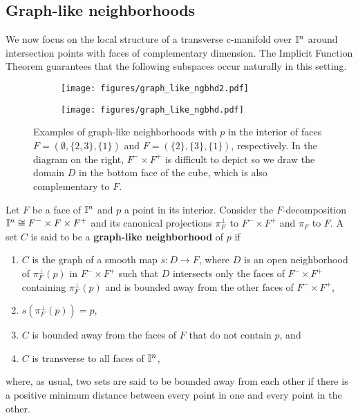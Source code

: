 \subsection{Graph-like neighborhoods}

We now focus on the local structure of a transverse c-manifold over $\mathbb{I}^n$ around intersection points with faces of complementary dimension.
The Implicit Function Theorem guarantees that the following subspaces occur naturally in this setting.

\begin{figure}[!h]
	\centering
	\begin{subfigure}{.32\textwidth}
		\texttt{[image: figures/graph\_like\_ngbhd2.pdf]}
		\hfill
	\end{subfigure}
	\begin{subfigure}{.32\textwidth}
		\hfill
		\texttt{[image: figures/graph\_like\_ngbhd.pdf]}
	\end{subfigure}
	\caption{Examples of graph-like neighborhoods with $p$ in the interior of faces $F=(\emptyset, \{2,3\}, \{1\})$ and $F=(\{2\}, \{3\}, \{1\})$, respectively.
		In the diagram on the right, $F^-\times F^+$ is difficult to depict so we draw the domain $D$ in the bottom face of the cube, which is also complementary to $F$.}
	\label{F:graph like neighborhood}
\end{figure}

\begin{definition}\label{D:graph-like}
	Let $F$ be a face of $\mathbb{I}^n$ and $p$ a point in its interior.
	Consider the $F$-decomposition $\mathbb{I}^n \cong F^- \times F \times F^+$ and its canonical projections $\pi_F^{\perp}$ to $F^- \times F^+$ and $\pi_F$ to $F$.
	A set $C$ is said to be a \textbf{graph-like neighborhood} of $p$ if
	\begin{enumerate}
		\item $C$ is the graph of a smooth map $s \colon D \to F$, where $D$ is an open neighborhood of $\pi_F^\perp(p)$ in $F^- \times F^+$ such that $D$ intersects only the faces of $F^- \times F^+$ containing $\pi_F^\perp(p)$ and is bounded away from the other faces of $F^- \times F^+$,
		\item $s(\pi_F^\perp(p)) = p$,
		\item $C$ is bounded away from the faces of $F$ that do not contain $p$, and
		\item $C$ is transverse to all faces of $\mathbb{I}^n$,
	\end{enumerate}
	where, as usual, two sets are said to be bounded away from each other if there is a positive minimum distance between every point in one and every point in the other.
\end{definition}

